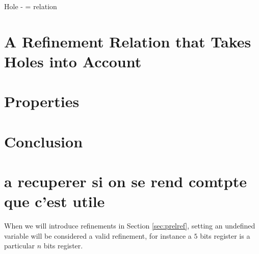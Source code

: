 \documentclass[runningheads]{llncs}
\begin{document}
Hole - = relation





\section{A Refinement Relation that Takes Holes into Account}\label{sec:holes}

\section{Properties}\label{sec:prop}

\section{Conclusion}\label{sec:ccl}


\section{a recuperer si on se rend comtpte que c'est utile}
When we will introduce refinements in Section \ref{sec:prelref}, setting an undefined variable will be considered a valid refinement, for instance a \(5\) bits register is a particular \(n\) bits register.


 
 
\end{document}
